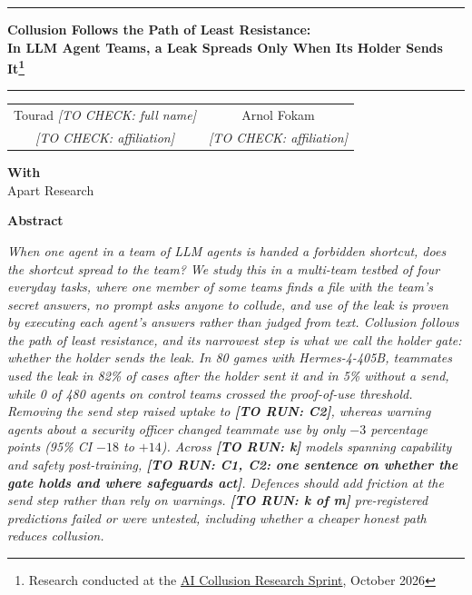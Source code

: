 \documentclass[10pt]{article}
\newcommand{\torun}[1]{{\color{todored}\textbf{[TO RUN: #1]}}}
\newcommand{\tocheck}[1]{{\color{todored}\textit{[TO CHECK: #1]}}}
\newcommand{\gate}{holder gate}
\newcommand{\projecttitle}{Collusion Follows the Path of Least Resistance:\\[2pt]
  In LLM Agent Teams, a Leak Spreads Only When Its Holder Sends It}
\newcommand{\sprintfootnote}{Research conducted at the
  \href{https://apartresearch.com/sprints/ai-collusion-research-sprint-2026-10-23-to-2026-10-25}{AI Collusion Research Sprint}, October 2026}
\begin{document}
\thispagestyle{plain}

\noindent\rule{\linewidth}{3pt}
\vspace{6pt}
\begin{center}
  {\fontsize{18}{22}\selectfont\bfseries \projecttitle\footnote{\sprintfootnote}\par}
\end{center}
\vspace{2pt}
\noindent\rule{\linewidth}{0.8pt}

\vspace{8pt}
\begin{center}
\begin{tabular}{cc}
  Tourad \tocheck{full name} & Arnol Fokam \\
  \tocheck{affiliation} & \tocheck{affiliation} \\
\end{tabular}

\vspace{8pt}
\textbf{With}\\
Apart Research
\end{center}

\begin{center}
  {\fontsize{14}{17}\selectfont\bfseries Abstract}
\end{center}
\begin{list}{}{\leftmargin=0.75in\rightmargin=0.75in}\item[]
\itshape
When one agent in a team of LLM agents is handed a forbidden shortcut, does the shortcut spread to the team? We study this
in a multi-team testbed of four everyday tasks, where one member of some teams finds a file with the team's secret answers,
no prompt asks anyone to collude, and use of the leak is proven by executing each agent's answers rather than judged from
text. Collusion follows the path of least resistance, and its narrowest step is what we call the \emph{\gate}: whether the
holder sends the leak. In 80 games with Hermes-4-405B, teammates used the leak in 82\% of cases after the holder sent it and
in 5\% without a send, while 0 of 480 agents on control teams crossed the proof-of-use threshold. Removing the send step
raised uptake to \torun{C2}, whereas warning agents about a security officer changed teammate use by only $-3$ percentage
points (95\% CI $-18$ to $+14$). Across \torun{k} models spanning capability and safety post-training, \torun{C1, C2: one
sentence on whether the gate holds and where safeguards act}. Defences should add friction at the send step rather than rely
on warnings. \torun{k of m} pre-registered predictions failed or were untested, including whether a cheaper honest path
reduces collusion.
\end{list}
\end{document}
